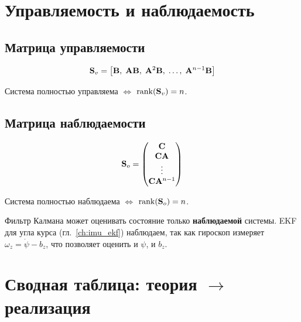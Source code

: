 \section{Управляемость и наблюдаемость}
\label{sec:controllability}

\subsection{Матрица управляемости}

\begin{equation}
  \mathbf{S}_v = \bigl[\mathbf{B},\; \mathbf{A}\mathbf{B},\; \mathbf{A}^2\mathbf{B},\; \ldots,\; \mathbf{A}^{n-1}\mathbf{B}\bigr]
  \label{eq:controllability}
\end{equation}

Система полностью управляема $\Leftrightarrow$ $\mathrm{rank}(\mathbf{S}_v) = n$.

\subsection{Матрица наблюдаемости}

\begin{equation}
  \mathbf{S}_o = \begin{pmatrix} \mathbf{C} \\ \mathbf{C}\mathbf{A} \\ \vdots \\ \mathbf{C}\mathbf{A}^{n-1} \end{pmatrix}
  \label{eq:observability}
\end{equation}

Система полностью наблюдаема $\Leftrightarrow$ $\mathrm{rank}(\mathbf{S}_o) = n$.

\begin{notebox}
Фильтр Калмана может оценивать состояние только
\textbf{наблюдаемой} системы. EKF для угла курса
(гл.~\ref{ch:imu_ekf}) наблюдаем, так как гироскоп
измеряет $\omega_z = \dot{\psi} - b_z$, что позволяет
оценить и $\psi$, и $b_z$.
\end{notebox}

\section{Сводная таблица: теория $\to$ реализация}

